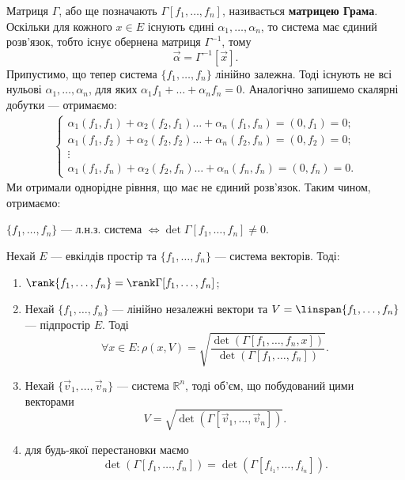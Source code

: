 \documentclass{math_library}
\begin{document}
Матриця $\Gamma$, або ще позначають $\Gamma[f_1,\dots,f_n]$, називається \textbf{матрицею Грама}.\\
Оскільки для кожного $x \in E$ існують єдині $\alpha_1,\dots,\alpha_n$, то система має єдиний розв'язок, тобто існує обернена матриця $\Gamma^{-1}$, тому
\[
\vec{\alpha} = \Gamma^{-1} [\vec{x}].
\]
Припустимо, що тепер система $\{f_1,\dots,f_n\}$ лінійно залежна. Тоді існують не всі нульові $\alpha_1,\dots,\alpha_n$, для яких $\alpha_1 f_1 + \dots + \alpha_n f_n = 0$. Аналогічно запишемо скалярні добутки --- отримаємо:
\begin{align*}
\begin{cases}
\alpha_1 (f_1,f_1) + \alpha_2 (f_2,f_1) \dots + \alpha_n (f_1,f_n) = (0,f_1) = 0; \\
\alpha_1 (f_1,f_2) + \alpha_2 (f_2,f_2) \dots + \alpha_n (f_2,f_n) = (0,f_2) = 0; \\
\vdots \\
\alpha_1 (f_1,f_n) + \alpha_2 (f_2,f_n) \dots + \alpha_n (f_n,f_n) = (0,f_n) = 0.
\end{cases}
\end{align*}
Ми отримали однорідне рівння, що має не єдиний розв'язок. Таким чином, отримаємо:

\begin{proposition}
$\{f_1,\dots,f_n\}$ --- л.н.з. система $\iff \det \Gamma[f_1,\dots,f_n] \neq 0$.
\end{proposition}

\begin{proposition}
Нехай $E$ --- евкілдів простір та $\{f_1,\dots,f_n\}$ --- система векторів. Тоді:
\begin{enumerate}[nosep, wide=0pt, label={\arabic*)}]
\item $\rank \{f_1,\dots,f_n\} = \rank \Gamma [f_1,\dots,f_n]$;
\item Нехай $\{f_1,\dots,f_n\}$ --- лінійно незалежні вектори та $V = \linspan\{f_1,\dots,f_n\}$ --- підпростір $E$. Тоді
\[
 \forall x \in E: \rho(x,V) = \sqrt{\dfrac{\det(\Gamma[f_1,\dots,f_n,x])}{\det(\Gamma[f_1,\dots,f_n])}}.
 \]
\item Нехай $\{\vec{v}_1,\dots,\vec{v}_n\}$ --- система $\mathbb{R}^n$, тоді об'єм, що побудований цими векторами \[
V = \sqrt{\det(\Gamma[\vec{v}_1,\dots,\vec{v}_n])}.
\]
\item для будь-якої перестановки маємо \[
\det(\Gamma[f_1,\dots,f_n]) = \det(\Gamma[f_{i_1},\dots,f_{i_n}]).
\]
\end{enumerate}
\end{proposition}
\end{document}
